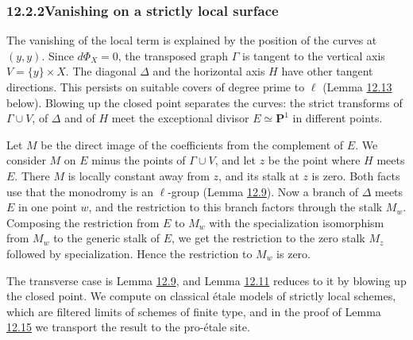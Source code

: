 \documentclass[11pt]{article}
\begin{document}
\subsubsection*{\texorpdfstring{12.2.2\quad Vanishing on a strictly local surface}{12.2.2 Vanishing on a strictly local surface}}
\label{bp24}%
\label{bp25}%
The vanishing of the local term is explained by the position of the curves at \((y,y)\). Since \(d\Phi_X=0\), the transposed graph \(\Gamma\) is tangent to the vertical axis \(V=\{y\}\times X\). The diagonal \(\Delta\) and the horizontal axis \(H\) have other tangent directions. This persists on suitable covers of degree prime to \(\ell\) (Lemma \hyperref[bp40]{12.13} below). Blowing up the closed point separates the curves: the strict transforms of \(\Gamma\cup V\), of \(\Delta\) and of \(H\) meet the exceptional divisor \(E\simeq\mathbf P^1\) in different points.

Let \(M\) be the direct image of the coefficients from the complement of \(E\). We consider \(M\) on \(E\) minus the points of \(\Gamma\cup V\), and let \(z\) be the point where \(H\) meets \(E\). There \(M\) is locally constant away from \(z\), and its stalk at \(z\) is zero. Both facts use that the monodromy is an \(\ell\)-group (Lemma \hyperref[bp28]{12.9}). Now a branch of \(\Delta\) meets \(E\) in one point \(w\), and the restriction to this branch factors through the stalk \(M_w\). Composing the restriction from \(E\) to \(M_w\) with the specialization isomorphism from \(M_w\) to the generic stalk of \(E\), we get the restriction to the zero stalk \(M_z\) followed by specialization. Hence the restriction to \(M_w\) is zero.

The transverse case is Lemma \hyperref[bp28]{12.9}, and Lemma \hyperref[bp34]{12.11} reduces to it by blowing up the closed point. We compute on classical étale models of strictly local schemes, which are filtered limits of schemes of finite type, and in the proof of Lemma \hyperref[bp45]{12.15} we transport the result to the pro-étale site.
\end{document}
